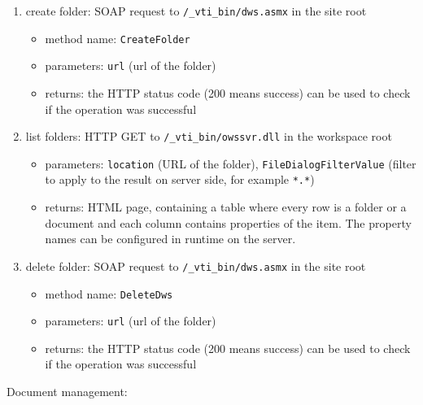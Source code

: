\begin{enumerate}
\item create folder: SOAP request to \texttt{/\_vti\_bin/dws.asmx} in the site root
\begin{itemize}
\item method name: \texttt{CreateFolder}
\item parameters: \texttt{url} (url of the folder)
\item returns: the HTTP status code (200 means success) can be used to check if the operation was successful
\end{itemize}

\item list folders: HTTP GET to \texttt{/\_vti\_bin/owssvr.dll} in the workspace root
\begin{itemize}
\item parameters: \texttt{location} (URL of the folder), \texttt{FileDialogFilterValue} (filter to apply to the result on server side, for example \texttt{*.*})
\item returns: HTML page, containing a table where every row is a folder or a
document and each column contains properties of the item. The property names
can be configured in runtime on the server.
\end{itemize}

\item delete folder: SOAP request to \texttt{/\_vti\_bin/dws.asmx} in the site root
\begin{itemize}
\item method name: \texttt{DeleteDws}
\item parameters: \texttt{url} (url of the folder)
\item returns: the HTTP status code (200 means success) can be used to check if the operation was successful
\end{itemize}
\end{enumerate}

Document management:

